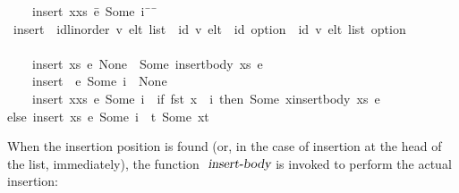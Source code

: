 \begin{isabelle}
~~~~{\isachardoublequoteopen}insert\ {\isacharparenleft}x{\isacharhash}xs{\isacharparenright}\ \=e\ {\isacharparenleft}Some\ i{\isacharparenright}\ \={\isacharequal}\ {\isacharparenleft}\=\kill
{}\ insert\ {\isacharcolon}{\isacharcolon}\ {\isachardoublequoteopen}{\isacharparenleft}{\isacharprime}id{\isacharcolon}{\isacharcolon}{\isacharbraceleft}linorder{\isacharbraceright}{\isacharcomma}\ {\isacharprime}v{\isacharparenright}\ elt\ list\ {\isasymRightarrow}\ {\isacharparenleft}{\isacharprime}id{\isacharcomma}\ {\isacharprime}v{\isacharparenright}\ elt\ {\isasymRightarrow}\ {\isacharprime}id\ option\ {\isasymRightarrow}\ {\isacharparenleft}{\isacharprime}id{\isacharcomma}\ {\isacharprime}v{\isacharparenright}\ elt\ list\ option{\isachardoublequoteclose}\\
\\
~~~~{\isachardoublequoteopen}insert\ xs\ \>e\ None\ \>{\isacharequal}\ Some\ {\isacharparenleft}insert{\isacharunderscore}body\ xs\ e{\isacharparenright}{\isachardoublequoteclose}\ {\isacharbar}\\
~~~~{\isachardoublequoteopen}insert\ {\isacharbrackleft}{\isacharbrackright}\ \>e\ {\isacharparenleft}Some\ i{\isacharparenright}\ \>{\isacharequal}\ None{\isachardoublequoteclose}\ {\isacharbar}\\
~~~~{\isachardoublequoteopen}insert\ {\isacharparenleft}x{\isacharhash}xs{\isacharparenright}\ \>e\ {\isacharparenleft}Some\ i{\isacharparenright}\ \>{\isacharequal}\ {\isacharparenleft}\>if\ fst\ x\ {\isacharequal}\ i\ then\ Some\ {\isacharparenleft}x{\isacharhash}insert{\isacharunderscore}body\ xs\ e{\isacharparenright}\\
\>\>\>else\ insert\ xs\ e\ {\isacharparenleft}Some\ i{\isacharparenright}\ {\isasymbind}\ {\isacharparenleft}{\isasymlambda}t{\isachardot}\ Some\ {\isacharparenleft}x{\isacharhash}t{\isacharparenright}{\isacharparenright}{\isacharparenright}{\isachardoublequoteclose}
\end{isabelle}
When the insertion position is found (or, in the case of insertion at the head of the list, immediately), the function $\isa{insert-body}$ is invoked to perform the actual insertion:
